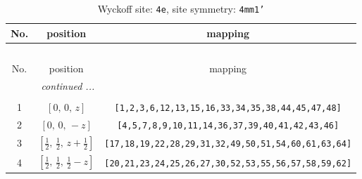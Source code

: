 \documentclass[fleqn,8pt]{jsarticle}
\begin{document}
\renewcommand{\arraystretch}{1.2}
\begin{longtable}{ccc}
\caption{Wyckoff site: {\tt 4e}, site symmetry: {\tt 4mm1'}}
 \\
 \hline \hline
No. & position & mapping \\ \hline \endfirsthead

\multicolumn{2}{l}{\tablename\ \thetable{}} \\
 \hline \hline
No. & position & mapping \\ \hline \endhead

 \hline \hline
\multicolumn{2}{r}{\footnotesize\it continued ...} \\ \endfoot

 \hline \hline
\multicolumn{2}{r}{} \\ \endlastfoot

1 & $\left[ 0,\, 0,\, z \right]$ & {\tt [1,2,3,6,12,13,15,16,33,34,35,38,44,45,47,48]} \\ \hline
2 & $\left[ 0,\, 0,\, - z \right]$ & {\tt [4,5,7,8,9,10,11,14,36,37,39,40,41,42,43,46]} \\ \hline
3 & $\left[ \frac{1}{2},\, \frac{1}{2},\, z + \frac{1}{2} \right]$ & {\tt [17,18,19,22,28,29,31,32,49,50,51,54,60,61,63,64]} \\ \hline
4 & $\left[ \frac{1}{2},\, \frac{1}{2},\, \frac{1}{2} - z \right]$ & {\tt [20,21,23,24,25,26,27,30,52,53,55,56,57,58,59,62]} \\
\end{longtable}
\renewcommand{\arraystretch}{1.2}
\end{document}
